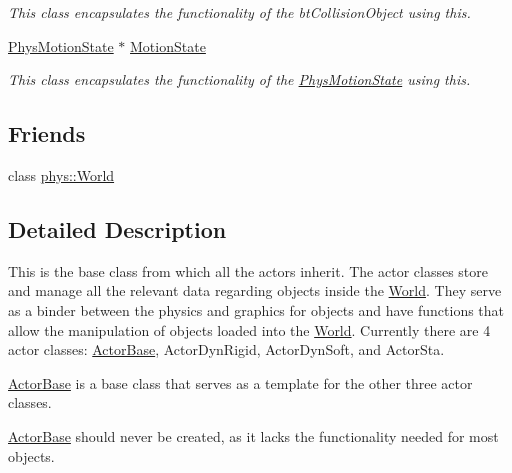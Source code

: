 \begin{DoxyCompactItemize}
\begin{DoxyCompactList}\small\item\em This class encapsulates the functionality of the btCollisionObject using this. \item\end{DoxyCompactList}\item 
\hypertarget{classphys_1_1ActorBase_a44934cb1db748c3c69e3b88a8dd17dcb}{
\hyperlink{classphys_1_1PhysMotionState}{PhysMotionState} $\ast$ \hyperlink{classphys_1_1ActorBase_a44934cb1db748c3c69e3b88a8dd17dcb}{MotionState}}
\label{d8/d0f/classphys_1_1ActorBase_a44934cb1db748c3c69e3b88a8dd17dcb}

\begin{DoxyCompactList}\small\item\em This class encapsulates the functionality of the \hyperlink{classphys_1_1PhysMotionState}{PhysMotionState} using this. \item\end{DoxyCompactList}\end{DoxyCompactItemize}
\subsection*{Friends}
\begin{DoxyCompactItemize}
\item 
\hypertarget{classphys_1_1ActorBase_ae18d4e9935739ce8709d2974a7e91b16}{
class \hyperlink{classphys_1_1ActorBase_ae18d4e9935739ce8709d2974a7e91b16}{phys::World}}
\label{d8/d0f/classphys_1_1ActorBase_ae18d4e9935739ce8709d2974a7e91b16}

\end{DoxyCompactItemize}


\subsection{Detailed Description}
This is the base class from which all the actors inherit. The actor classes store and manage all the relevant data regarding objects inside the \hyperlink{classphys_1_1World}{World}. They serve as a binder between the physics and graphics for objects and have functions that allow the manipulation of objects loaded into the \hyperlink{classphys_1_1World}{World}. Currently there are 4 actor classes: \hyperlink{classphys_1_1ActorBase}{ActorBase}, ActorDynRigid, ActorDynSoft, and ActorSta. \par
 \hyperlink{classphys_1_1ActorBase}{ActorBase} is a base class that serves as a template for the other three actor classes. \par
 \hyperlink{classphys_1_1ActorBase}{ActorBase} should never be created, as it lacks the functionality needed for most objects. 

